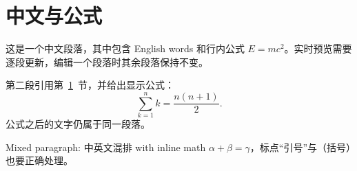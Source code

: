 \documentclass{ctexart}
\begin{document}
\section{中文与公式}\label{sec:cjk}
这是一个中文段落，其中包含 English words 和行内公式 $E=mc^2$。实时预览需要逐段更新，编辑一个段落时其余段落保持不变。

第二段引用第~\ref{sec:cjk}~节，并给出显示公式：
\[ \sum_{k=1}^{n} k = \frac{n(n+1)}{2}. \]
公式之后的文字仍属于同一段落。

Mixed paragraph: 中英文混排 with inline math $\alpha+\beta=\gamma$，标点“引号”与（括号）也要正确处理。
\end{document}
